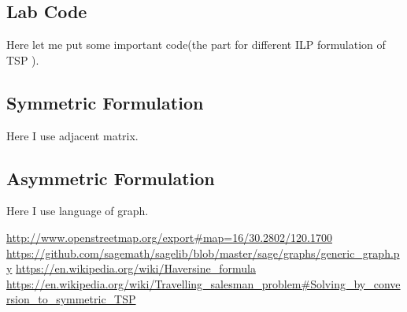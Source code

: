 \documentclass{mcmthesis}
\begin{document}
\begin{appendices}
\section{Lab Code}
Here let me put some important code(the part for different ILP formulation of TSP ).
%	
	\subsection{Symmetric Formulation} \label{code:sage}
	Here I use adjacent matrix. 
	
	\subsection{Asymmetric Formulation}
	Here I use language of graph. 
	 \label{code:sage2}
%		
	
	
%					
\end{appendices}


\begin{thebibliography}{99}
	 \url{http://www.openstreetmap.org/export#map=16/30.2802/120.1700}
	 \url{https://github.com/sagemath/sagelib/blob/master/sage/graphs/generic_graph.py}	
	  \url{https://en.wikipedia.org/wiki/Haversine_formula}
	 \url{https://en.wikipedia.org/wiki/Travelling_salesman_problem#Solving_by_conversion_to_symmetric_TSP}
\end{thebibliography}
\end{document}
